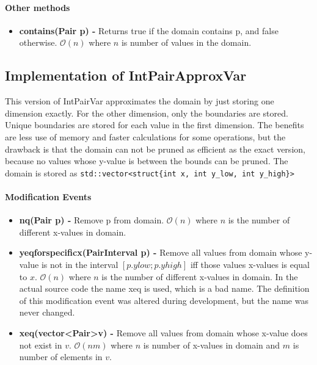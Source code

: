 \documentclass[a4paper,11pt]{article}
\begin{document}
\paragraph{Other methods}
\begin{itemize}
\item {\textbf{contains(Pair p) - }} Returns true if the domain contains p, and false otherwise. $\mathcal{O}(n)$ where $n$ is number of values in the domain.
\end{itemize}

\subsection{Implementation of IntPairApproxVar}
\label{sec:impapprox}
This version of IntPairVar approximates the domain by just storing one dimension exactly. For the other dimension, only the boundaries are stored. Unique boundaries are stored for each value in the first dimension. The benefits are less use of memory and faster calculations for some operations, but the drawback is that the domain can not be pruned as efficient as the exact version, because no values whose y-value is between the bounds can be pruned. The domain is stored as \texttt{std::vector<struct\{int x, int y\_low, int y\_high\}>}

\paragraph{Modification Events}
\begin{itemize}
\item {\textbf{nq(Pair p) - }} Remove p from domain. $\mathcal{O}(n)$ where $n$ is the number of different x-values in domain.

\item{\textbf{yeqforspecificx(PairInterval p) - }} Remove all values from domain whose y-value is not in the interval $[p.ylow; p.yhigh]$ iff those values x-values is equal to $x$. $\mathcal{O}(n)$ where $n$ is the number of different x-values in domain. In the actual source code the name xeq is used, which is a bad name. The definition of this modification event was altered during development, but the name was never changed.

\item{\textbf{xeq(vector\textless Pair\textgreater v) - }} Remove all values from domain whose x-value does not exist in $v$. $\mathcal{O}(nm)$ where $n$ is number of x-values in domain and $m$ is number of elements in $v$.
\end{itemize}
\end{document}
